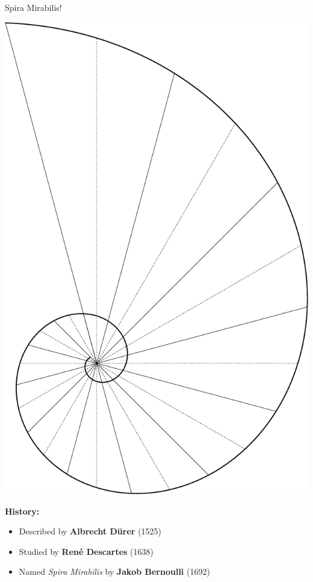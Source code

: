 \documentclass[14pt]{beamer}
\begin{document}
    \begin{frame}{Spira Mirabilis!}
        \begin{center}
            \begin{minipage}{20ex}
                \includegraphics[height=32ex]{pictures/Spiral_Phi_90.pdf}
            \end{minipage} \begin{minipage}{29ex}
                \textbf{\large \quad History:}
                \bigskip
                \begin{itemize}
                    \small
                    \item Described by \textbf{Albrecht Dürer} (1525)\\[2ex]
                    \item Studied by \textbf{René Descartes} (1638) \\[2ex]
                    \item Named \emph{Spira Mirabilis} by \textbf{Jakob Bernoulli} (1692)
                \end{itemize}
            \end{minipage}            
        \end{center}
    \end{frame}

\end{document}
